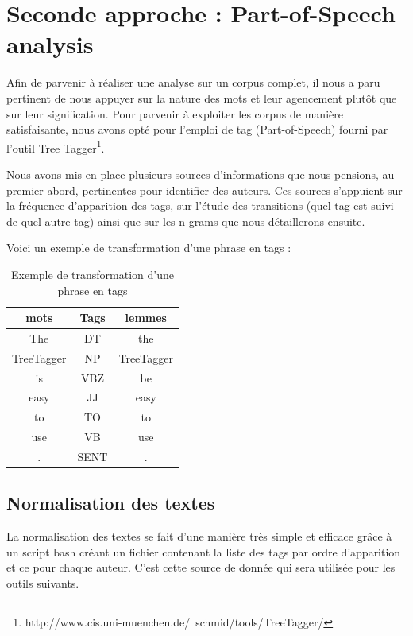 \documentclass[a4paper,12pt]{report}
\begin{document}
\section{Seconde approche : Part-of-Speech analysis}

Afin de parvenir à réaliser une analyse sur un corpus complet, il nous a paru pertinent de nous appuyer sur la nature des mots et leur agencement plutôt que sur leur signification. Pour parvenir à exploiter les corpus de manière satisfaisante, nous avons opté pour l'emploi de tag (Part-of-Speech) fourni par l'outil Tree Tagger\footnote{http://www.cis.uni-muenchen.de/~schmid/tools/TreeTagger/}.

Nous avons mis en place plusieurs sources d'informations que nous pensions, au premier abord, pertinentes pour identifier des auteurs. Ces sources s'appuient sur la fréquence d'apparition des tags, sur l'étude des transitions (quel tag est suivi de quel autre tag) ainsi que sur les n-grams que nous détaillerons ensuite.

Voici un exemple de transformation d'une phrase en tags : 

\begin{table}[hbtp]
	\centering
		\begin{tabular}{|*{3}{c|}}
			\hline
			\textbf{mots} & \textbf{Tags} & \textbf{lemmes}\\
			\hline
			The & DT & the \\
			\hline
			TreeTagger & NP  & TreeTagger \\
			\hline
			is & VBZ  & be \\
			\hline
			easy & JJ & easy \\
			\hline
			 to & TO & to \\
			\hline
			use  & VB  & use \\
			\hline
			. & SENT & . \\
			\hline
		\end{tabular}
	\caption{Exemple de transformation d'une phrase en tags}
	\label{fig:TableauTag}
\end{table}


\subsection{Normalisation des textes}

La normalisation des textes se fait d'une manière très simple et efficace grâce à un script bash créant un fichier contenant la liste des tags par ordre d'apparition et ce pour chaque auteur. C'est cette source de donnée qui sera utilisée pour les outils suivants. 
\end{document}

